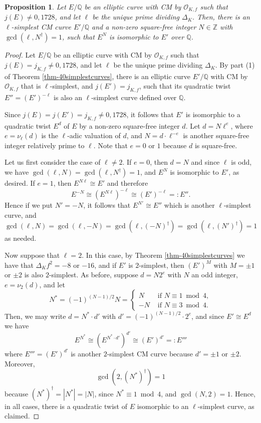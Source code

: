 \documentclass[11pt]{amsart}
\newtheorem{prop}[defn]{Proposition}
\theoremstyle{definition}
\newcommand{\Q}{\mathbb{Q}}
\newcommand{\Z}{\mathbb{Z}}
\newcommand{\Of}{\mathcal{O}_{K,f}}
\begin{document}
\begin{prop}\label{prop-correcttwist}
    Let $E/\Q$ be an elliptic curve with CM by $\Of$ such that $j(E)\neq 0,1728$, and let $\ell$ be the unique prime dividing $\Delta_K$. Then, there is an $\ell$-simplest CM curve $E'/\Q$ and a non-zero square-free integer $N\in\Z$ with $\gcd(\ell,N^\dagger)=1$, such that $E^N$ is isomorphic to $E'$ over $\Q$.
\end{prop}
\begin{proof}
    Let $E/\Q$ be an elliptic curve with CM by $\Of$ such that $j(E)=j_{K,f}\neq 0,1728$, and let $\ell$ be the unique prime dividing $\Delta_K$. By part (1) of Theorem \ref{thm-40simplestcurves}, there is an elliptic curve $E'/\Q$ with CM by $\Of$ that is $\ell$-simplest, and $j(E')=j_{K,f}$, such that its quadratic twist $E''=(E')^{-\ell}$ is also an $\ell$-simplest curve defined over $\Q$.

    Since $j(E)=j(E')=j_{K,f}\neq 0,1728$, it follows that $E'$ is isomorphic to a quadratic twist $E^d$ of $E$ by a non-zero square-free integer $d$. Let $d=N\ell^e$, where  $e=\nu_\ell(d)$ is the $\ell$-adic valuation of $d$, and $N=d\cdot \ell^{-e}$ is another square-free integer relatively prime to $\ell$. Note that $e=0$ or $1$ because $d$ is square-free.

    Let us first consider the case of $\ell\neq 2$. If $e=0$, then $d=N$ and since $\ell$ is odd, we have $\gcd(\ell,N)=\gcd(\ell,N^\dagger)=1$, and $E^N$ is isomorphic to $E'$, as desired. If $e=1$, then $E^{N\ell} \cong E'$ and therefore 
    $$E^{-N}\cong (E^{N\ell})^{-\ell}\cong (E')^{-\ell} =: E''.$$
    Hence if we put $N'=-N$, it follows that $E^{N'}\cong E''$ which is another $\ell$-simplest curve, and $\gcd(\ell,N)=\gcd(\ell,-N) = \gcd(\ell,(-N)^\dagger)=\gcd(\ell,(N')^\dagger)=1$ as needed.

    Now suppose that $\ell=2$. In this case, by Theorem \ref{thm-40simplestcurves} we have that $\Delta_K f^2 = -8$ or $-16$, and if $E'$ is $2$-simplest, then $(E')^M$ with $M=\pm 1$ or $\pm 2$ is also $2$-simplest. As before, suppose $d=N2^e$ with $N$ an odd integer, $e=\nu_2(d)$, and let 
    $$N^\ast = (-1)^{(N-1)/2}N=\begin{cases}
        N &\text{ if } N\equiv 1 \bmod 4,\\
        -N &\text{ if } N\equiv 3 \bmod 4.
    \end{cases}$$ 
    Then, we may write $d=N^\ast\cdot d'$ with $d'=(-1)^{(N-1)/2}\cdot 2^{e}$, and since $E'\cong E^d$ we have
    $$E^{N^\ast}\cong (E^{N^\ast \cdot d'})^{d'} \cong (E')^{d'} =: E'''$$
    where $E''' = (E')^{d'}$ is another $2$-simplest CM curve because $d'=\pm 1$ or $\pm 2$. Moreover, $$\gcd(2,(N^\ast)^\dagger)=1$$ because $(N^\ast)^\dagger = |N^\ast|=|N|$, since $N^\ast \equiv 1 \bmod 4$, and $\gcd(N,2)=1$. Hence, in all cases, there is a quadratic twist of $E$ isomorphic to an $\ell$-simplest curve, as claimed.
\end{proof}
\end{document}
